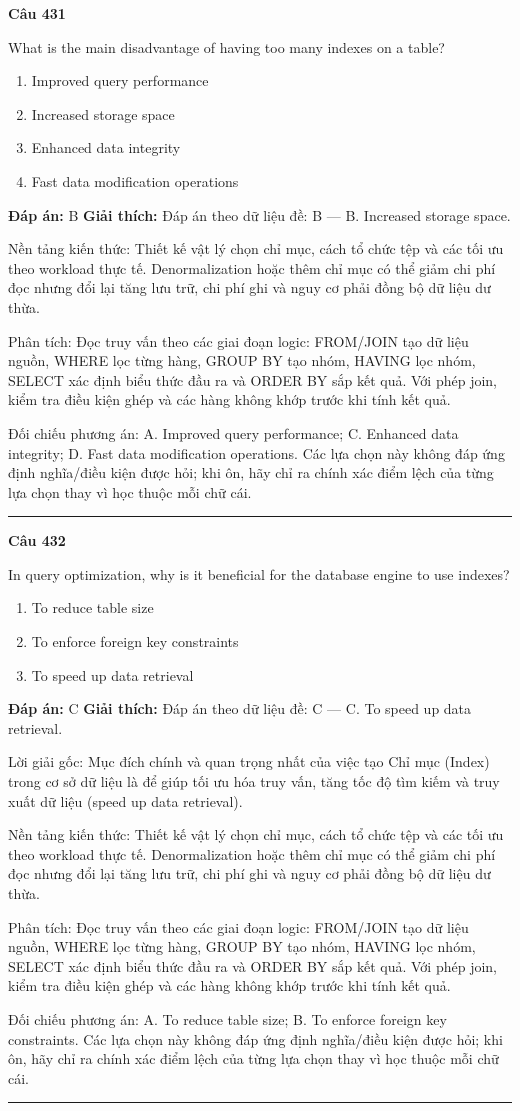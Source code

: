\documentclass[11pt,a4paper]{article}
\newenvironment{question}[1]{%
  \par\vspace{1em}\noindent\textbf{\large Câu #1}\par\vspace{0.4em}
}{%
  \par\vspace{1em}\hrule\vspace{0.6em}
}
\newenvironment{choices}{%
  \begin{enumerate}[label=\textbf{\Alph*.},leftmargin=2.2em,itemsep=2pt,topsep=3pt]
}{%
  \end{enumerate}
}
\newcommand{\choice}{\item}
\begin{document}
\begin{question}{431}
What is the main disadvantage of having too many indexes on a table?
\begin{choices}
\choice Improved query performance
\choice Increased storage space
\choice Enhanced data integrity
\choice Fast data modification operations
\end{choices}
\textbf{Đáp án:} B
\textbf{Giải thích:} Đáp án theo dữ liệu đề: B — B. Increased storage space.

Nền tảng kiến thức: Thiết kế vật lý chọn chỉ mục, cách tổ chức tệp và các tối ưu theo workload thực tế. Denormalization hoặc thêm chỉ mục có thể giảm chi phí đọc nhưng đổi lại tăng lưu trữ, chi phí ghi và nguy cơ phải đồng bộ dữ liệu dư thừa.

Phân tích: Đọc truy vấn theo các giai đoạn logic: FROM/JOIN tạo dữ liệu nguồn, WHERE lọc từng hàng, GROUP BY tạo nhóm, HAVING lọc nhóm, SELECT xác định biểu thức đầu ra và ORDER BY sắp kết quả. Với phép join, kiểm tra điều kiện ghép và các hàng không khớp trước khi tính kết quả.

Đối chiếu phương án: A. Improved query performance; C. Enhanced data integrity; D. Fast data modification operations. Các lựa chọn này không đáp ứng định nghĩa/điều kiện được hỏi; khi ôn, hãy chỉ ra chính xác điểm lệch của từng lựa chọn thay vì học thuộc mỗi chữ cái.
\end{question}

\begin{question}{432}
In query optimization, why is it beneficial for the database engine to use indexes?
\begin{choices}
\choice To reduce table size
\choice To enforce foreign key constraints
\choice To speed up data retrieval
\end{choices}
\textbf{Đáp án:} C
\textbf{Giải thích:} Đáp án theo dữ liệu đề: C — C. To speed up data retrieval.

Lời giải gốc: Mục đích chính và quan trọng nhất của việc tạo Chỉ mục (Index) trong cơ sở dữ liệu là để giúp tối ưu hóa truy vấn, tăng tốc độ tìm kiếm và truy xuất dữ liệu (speed up data retrieval).

Nền tảng kiến thức: Thiết kế vật lý chọn chỉ mục, cách tổ chức tệp và các tối ưu theo workload thực tế. Denormalization hoặc thêm chỉ mục có thể giảm chi phí đọc nhưng đổi lại tăng lưu trữ, chi phí ghi và nguy cơ phải đồng bộ dữ liệu dư thừa.

Phân tích: Đọc truy vấn theo các giai đoạn logic: FROM/JOIN tạo dữ liệu nguồn, WHERE lọc từng hàng, GROUP BY tạo nhóm, HAVING lọc nhóm, SELECT xác định biểu thức đầu ra và ORDER BY sắp kết quả. Với phép join, kiểm tra điều kiện ghép và các hàng không khớp trước khi tính kết quả.

Đối chiếu phương án: A. To reduce table size; B. To enforce foreign key constraints. Các lựa chọn này không đáp ứng định nghĩa/điều kiện được hỏi; khi ôn, hãy chỉ ra chính xác điểm lệch của từng lựa chọn thay vì học thuộc mỗi chữ cái.
\end{question}
\end{document}
